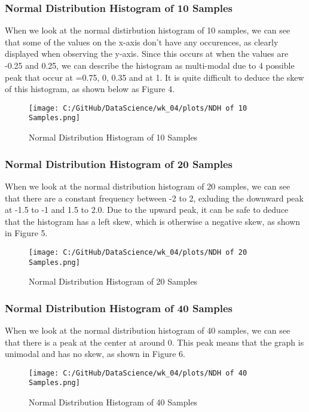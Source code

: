 \documentclass[a4paper,twocolumn]{article}
\begin{document}
\subsubsection{Normal Distribution Histogram of 10 Samples}
When we look at the normal distirbution histogram of 10 samples, we can see that some of the values on the x-axis
don't have any occurences, as clearly displayed when observing the y-axis. Since this occurs at when the values are 
-0.25 and 0.25, we can describe the histogram as multi-modal due to 4 possible peak that occur at =0.75, 0, 0.35 and
at 1. It is quite difficult to deduce the skew of this histogram, as shown below as Figure 4.

\begin{figure}[htbp] 
    \centering
    \noindent
    \texttt{[image: C:/GitHub/DataScience/wk\_04/plots/NDH of 10 Samples.png]}
    \caption{Normal Distribution Histogram of 10 Samples} 
\end{figure}

\subsubsection{Normal Distribution Histogram of 20 Samples}
When we look at the normal distribution histogram of 20 samples, we can see that there are a constant frequency 
between -2 to 2, exluding the downward peak at -1.5 to -1 and 1.5 to 2.0. Due to the upward peak, it can be safe
to deduce that the histogram has a left skew, which is otherwise a negative skew, as shown in Figure 5.

\begin{figure}[htbp] 
    \centering
    \noindent
    \texttt{[image: C:/GitHub/DataScience/wk\_04/plots/NDH of 20 Samples.png]}
    \caption{Normal Distribution Histogram of 20 Samples} 
\end{figure}

\subsubsection{Normal Distribution Histogram of 40 Samples}
When we look at the normal distribution histogram of 40 samples, we can see that there is a peak at the center at 
around 0. This peak means that the graph is unimodal and has no skew, as shown in Figure 6.


\begin{figure}[htbp] 
    \centering
    \noindent
    \texttt{[image: C:/GitHub/DataScience/wk\_04/plots/NDH of 40 Samples.png]}
    \caption{Normal Distribution Histogram of 40 Samples} 
\end{figure}
\end{document}
